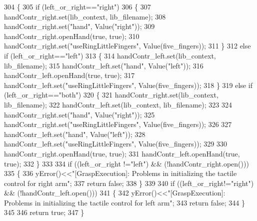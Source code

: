 \begin{DoxyCode}
304 \{
305     \textcolor{keywordflow}{if} (left_or_right==\textcolor{stringliteral}{"right"})
306     \{
307         handContr_right.set(lib_context, lib_filename);
308         handContr_right.set(\textcolor{stringliteral}{"hand"}, Value(\textcolor{stringliteral}{"right"}));
309         handContr_right.openHand(\textcolor{keyword}{true}, \textcolor{keyword}{true});
310         handContr_right.set(\textcolor{stringliteral}{"useRingLittleFingers"}, Value(five\_fingers));
311     \}
312     \textcolor{keywordflow}{else} \textcolor{keywordflow}{if} (left_or_right==\textcolor{stringliteral}{"left"})
313     \{
314         handContr\_left.set(lib_context, lib_filename);
315         handContr\_left.set(\textcolor{stringliteral}{"hand"}, Value(\textcolor{stringliteral}{"left"}));
316         handContr\_left.openHand(\textcolor{keyword}{true}, \textcolor{keyword}{true});
317         handContr\_left.set(\textcolor{stringliteral}{"useRingLittleFingers"}, Value(five\_fingers));
318     \}
319     \textcolor{keywordflow}{else} \textcolor{keywordflow}{if} (left_or_right==\textcolor{stringliteral}{"both"})
320     \{
321         handContr_right.set(lib_context, lib_filename);
322         handContr\_left.set(lib_context, lib_filename);
323 
324         handContr_right.set(\textcolor{stringliteral}{"hand"}, Value(\textcolor{stringliteral}{"right"}));
325         handContr_right.set(\textcolor{stringliteral}{"useRingLittleFingers"}, Value(five\_fingers));
326 
327         handContr\_left.set(\textcolor{stringliteral}{"hand"}, Value(\textcolor{stringliteral}{"left"}));
328         handContr\_left.set(\textcolor{stringliteral}{"useRingLittleFingers"}, Value(five\_fingers));
329 
330         handContr_right.openHand(\textcolor{keyword}{true}, \textcolor{keyword}{true});
331         handContr\_left.openHand(\textcolor{keyword}{true}, \textcolor{keyword}{true});
332     \}
333 
334     \textcolor{keywordflow}{if} ((left_or_right !=\textcolor{stringliteral}{"left"}) && (!handContr_right.open()))
335     \{
336         yError()<<\textcolor{stringliteral}{"[GraspExecution]: Problems in initializing the tactile control for right arm"};
337         \textcolor{keywordflow}{return} \textcolor{keyword}{false};
338     \}
339 
340     \textcolor{keywordflow}{if} ((left_or_right!=\textcolor{stringliteral}{"right"}) && (!handContr\_left.open()))
341     \{
342         yError()<<\textcolor{stringliteral}{"[GraspExecution]: Problems in initializing the tactile control for left arm"};
343         \textcolor{keywordflow}{return} \textcolor{keyword}{false};
344     \}
345 
346     \textcolor{keywordflow}{return} \textcolor{keyword}{true};
347 \}
\end{DoxyCode}
